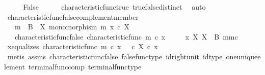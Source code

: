 \begin{isabellebody}
\ \ \isamarkupfalse%
\ \isamarkupfalse%
\ False\isanewline
\ \ \ \ \isamarkupfalse%
\ characteristic{\isacharunderscore}{\kern0pt}func{\isacharunderscore}{\kern0pt}true\ true{\isacharunderscore}{\kern0pt}false{\isacharunderscore}{\kern0pt}distinct\ \isamarkupfalse%
\ auto\isanewline
{}\isamarkupfalse%
%
\endisatagproof
{\isafoldproof}%
%
\isadelimproof
\isanewline
%
\endisadelimproof
\isanewline
{}\isamarkupfalse%
\ characteristic{\isacharunderscore}{\kern0pt}func{\isacharunderscore}{\kern0pt}false{\isacharunderscore}{\kern0pt}complement{\isacharunderscore}{\kern0pt}member{\isacharcolon}{\kern0pt}\isanewline
\ \ \ {\isachardoublequoteopen}m\ {\isacharcolon}{\kern0pt}\ B\ {\isasymrightarrow}\ X{\isachardoublequoteclose}\ {\isachardoublequoteopen}monomorphism\ m{\isachardoublequoteclose}\ {\isachardoublequoteopen}x\ {\isasymin}\isactrlsub c\ X{\isachardoublequoteclose}\isanewline
\ \ \ characteristic{\isacharunderscore}{\kern0pt}func{\isacharunderscore}{\kern0pt}false{\isacharcolon}{\kern0pt}\ {\isachardoublequoteopen}characteristic{\isacharunderscore}{\kern0pt}func\ m\ {\isasymcirc}\isactrlsub c\ x\ {\isacharequal}{\kern0pt}\ {\isasymf}{\isachardoublequoteclose}\isanewline
\ \ \ {\isachardoublequoteopen}x\ {\isasymin}\isactrlbsub X\isactrlesub \ {\isacharparenleft}{\kern0pt}X\ {\isasymsetminus}\ {\isacharparenleft}{\kern0pt}B{\isacharcomma}{\kern0pt}\ m{\isacharparenright}{\kern0pt}{\isacharcomma}{\kern0pt}m\isactrlsup c{\isacharparenright}{\kern0pt}{\isachardoublequoteclose}\isanewline
%
\isadelimproof
%
\endisadelimproof
%
\isatagproof
{}\isamarkupfalse%
\ {\isacharminus}{\kern0pt}\isanewline
\ \ \isamarkupfalse%
\ x{\isacharunderscore}{\kern0pt}equalizes{\isacharcolon}{\kern0pt}\ {\isachardoublequoteopen}characteristic{\isacharunderscore}{\kern0pt}func\ m\ {\isasymcirc}\isactrlsub c\ x\ {\isacharequal}{\kern0pt}\ {\isasymf}\ {\isasymcirc}\isactrlsub c\ {\isasymbeta}\isactrlbsub X\isactrlesub \ {\isasymcirc}\isactrlsub c\ x{\isachardoublequoteclose}\isanewline
\ \ \ \ \isamarkupfalse%
\ {\isacharparenleft}{\kern0pt}metis\ assms{\isacharparenleft}{\kern0pt}{}{\isacharparenright}{\kern0pt}\ characteristic{\isacharunderscore}{\kern0pt}func{\isacharunderscore}{\kern0pt}false\ false{\isacharunderscore}{\kern0pt}func{\isacharunderscore}{\kern0pt}type\ id{\isacharunderscore}{\kern0pt}right{\isacharunderscore}{\kern0pt}unit{}\ id{\isacharunderscore}{\kern0pt}type\ one{\isacharunderscore}{\kern0pt}unique{\isacharunderscore}{\kern0pt}element\ terminal{\isacharunderscore}{\kern0pt}func{\isacharunderscore}{\kern0pt}comp\ terminal{\isacharunderscore}{\kern0pt}func{\isacharunderscore}{\kern0pt}type{\isacharparenright}{\kern0pt}\isanewline

\end{isabellebody}
